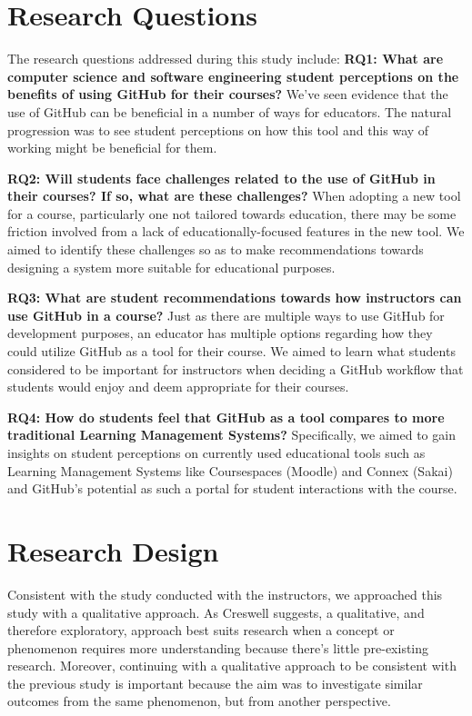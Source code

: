 
\section{Research Questions}
The research questions addressed during this study include:
\bigskip
\textbf{RQ1: What are computer science and software engineering student perceptions on the benefits of using GitHub for their courses?} We've seen evidence that the use of GitHub can be beneficial in a number of ways for educators. The natural progression was to see student perceptions on how this tool and this way of working might be beneficial for them.

\bigskip
\textbf{RQ2: Will students face challenges related to the use of GitHub in their courses? If so, what are these challenges?} When adopting a new tool for a course, particularly one not tailored towards education, there may be some friction involved from a lack of educationally-focused features in the new tool. We aimed to identify these challenges so as to make recommendations towards designing a system more suitable for educational purposes.

\bigskip
\textbf{RQ3: What are student recommendations towards how instructors can use GitHub in a course?} Just as there are multiple ways to use GitHub for development purposes, an educator has multiple options regarding how they could utilize GitHub as a tool for their course. We aimed to learn what students considered to be important for instructors when deciding a GitHub workflow that students would enjoy and deem appropriate for their courses.

\bigskip
\textbf{RQ4: How do students feel that GitHub as a tool compares to more traditional Learning Management Systems?} Specifically, we aimed to gain insights on student perceptions on currently used educational tools such as Learning Management Systems like Coursespaces (Moodle) and Connex (Sakai) and GitHub's potential as such a portal for student interactions with the course.

\section{Research Design}
Consistent with the study conducted with the instructors, we approached this study with a qualitative approach. As Creswell \cite{creswell2013research} suggests, a qualitative, and therefore exploratory, approach best suits research when a concept or phenomenon requires more understanding because there's little pre-existing research. Moreover, continuing with a qualitative approach to be consistent with the previous study is important because the aim was to investigate similar outcomes from the same phenomenon, but from another perspective. %

